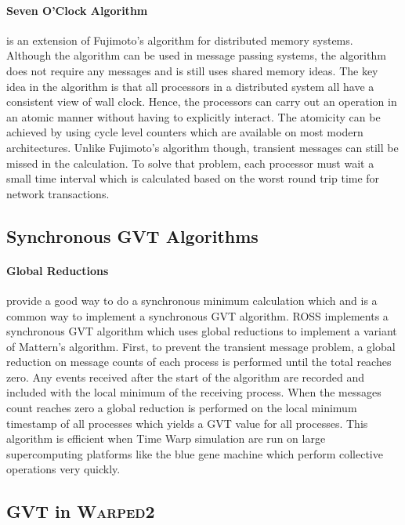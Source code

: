\documentclass[11pt]{book}
\begin{document}
\paragraph{Seven O'Clock Algorithm}\cite{bauer-05} is an extension of Fujimoto's algorithm
for distributed memory systems.  Although the algorithm can be used in message passing systems,
the algorithm does not require any messages and is still uses shared memory ideas.  The key idea
in the algorithm is that all processors in a distributed system all have a consistent view
of wall clock.  Hence, the processors can carry out an operation in an atomic manner without having
to explicitly interact.  The atomicity can be achieved by using cycle level counters which
are available on most modern architectures.  Unlike Fujimoto's algorithm though, transient
messages can still be missed in the calculation.  To solve that problem, each processor must
wait a small time interval which is calculated based on the worst round trip time for
network transactions.

\subsection{Synchronous GVT Algorithms}

\paragraph{Global Reductions} provide a good way to do a synchronous minimum calculation
which and is a common way to implement a synchronous GVT algorithm.  ROSS implements a
synchronous GVT algorithm which uses global reductions to implement a variant of Mattern's
algorithm\cite{holder-08}.  First, to prevent the transient message problem, a global reduction
on message counts of each process is performed until the total reaches zero.  Any events received
after the start of the algorithm are recorded and included with the local minimum of the receiving
process.  When the messages count reaches zero a global reduction is performed on the local minimum
timestamp of all processes which yields a GVT value for all processes.  This algorithm is efficient
when Time Warp simulation are run on large supercomputing platforms like the blue gene machine
which perform collective operations very quickly.

\subsection{GVT in \textsc{Warped2}}
\end{document}
